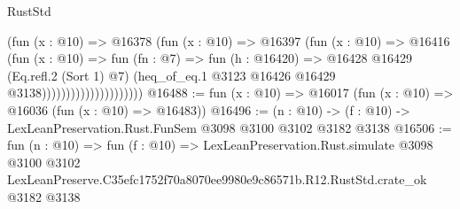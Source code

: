 \begin{lexlean}{RustStd}
\begin{coremodule}
                                    (fun (x : @10) =>
                                    @16378
                                      (fun (x : @10) =>
                                      @16397
                                        (fun (x : @10) =>
                                        @16416
                                          (fun (x : @10) =>
                                          fun (fn : @7) =>
                                          fun (h : @16420) =>
                                          @16428
                                            @16429
                                            (Eq.refl.{2} (Sort 1) @7)
                                            (heq_of_eq.{1}
                                              @3123
                                              @16426
                                              @16429
                                              @3138)))))))))))))))))))))
@16488 := fun (x : @10) => @16017 (fun (x : @10) => @16036 (fun (x : @10) => @16483))
@16496 := (n : @10) -> (f : @10) -> LexLeanPreservation.Rust.FunSem @3098 @3100 @3102 @3182 @3138
@16506 := fun (n : @10) =>
  fun (f : @10) =>
  LexLeanPreservation.Rust.simulate
    @3098
    @3100
    @3102
    LexLeanPreserve.C35efc1752f70a8070ee9980e9c86571b.R12.RustStd.crate_ok
    @3182
    @3138
\end{coremodule}
\end{lexlean}
